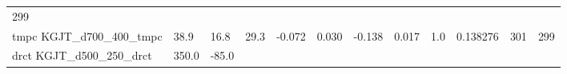 \documentclass[11pt]{article}
\begin{document}
\begin{longtable}[]{@{}llllllllllll@{}}
\begin{minipage}[t]{0.07\columnwidth}
299\strut
\end{minipage}\tabularnewline
\begin{minipage}[t]{0.18\columnwidth}\raggedright\strut
tmpc KGJT\_d700\_400\_tmpc\strut
\end{minipage} & \begin{minipage}[t]{0.04\columnwidth}\raggedright\strut
38.9\strut
\end{minipage} & \begin{minipage}[t]{0.04\columnwidth}\raggedright\strut
16.8\strut
\end{minipage} & \begin{minipage}[t]{0.04\columnwidth}\raggedright\strut
29.3\strut
\end{minipage} & \begin{minipage}[t]{0.04\columnwidth}\raggedright\strut
-0.072\strut
\end{minipage} & \begin{minipage}[t]{0.05\columnwidth}\raggedright\strut
0.030\strut
\end{minipage} & \begin{minipage}[t]{0.04\columnwidth}\raggedright\strut
-0.138\strut
\end{minipage} & \begin{minipage}[t]{0.04\columnwidth}\raggedright\strut
0.017\strut
\end{minipage} & \begin{minipage}[t]{0.05\columnwidth}\raggedright\strut
1.0\strut
\end{minipage} & \begin{minipage}[t]{0.05\columnwidth}\raggedright\strut
0.138276\strut
\end{minipage} & \begin{minipage}[t]{0.05\columnwidth}\raggedright\strut
301\strut
\end{minipage} & \begin{minipage}[t]{0.07\columnwidth}\raggedright\strut
299\strut
\end{minipage}\tabularnewline
\begin{minipage}[t]{0.18\columnwidth}\raggedright\strut
drct KGJT\_d500\_250\_drct\strut
\end{minipage} & \begin{minipage}[t]{0.04\columnwidth}\raggedright\strut
350.0\strut
\end{minipage} & \begin{minipage}[t]{0.04\columnwidth}\raggedright\strut
-85.0\strut
\end{minipage} & \begin{minipage}[t]{0.04\columnwidth}\raggedright\strut

\end{minipage}
\end{longtable}
\end{document}
